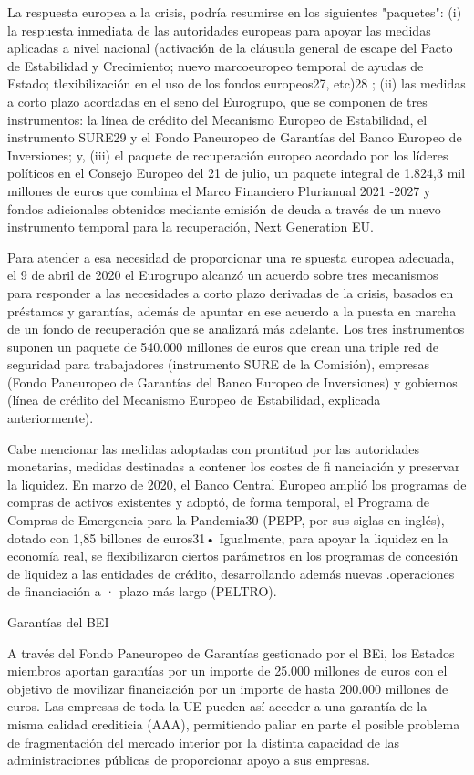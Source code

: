 \documentclass[10pt,a4paper]{article}
\begin{document}
La respuesta europea a la crisis, podría resumirse en los siguientes "paquetes": (i) la respuesta inmediata de las autoridades europeas para apoyar las medidas aplicadas a nivel nacional (activación de la cláusula general de escape del Pacto de Estabilidad y Crecimiento; nuevo marcoeuropeo temporal de ayudas de Estado; tlexibilización en el uso de los fondos europeos27, etc)28 ; (ii) las medidas a corto plazo acordadas en el seno del Eurogrupo, que se componen de tres instrumentos: la línea de crédito del Mecanismo Europeo de Estabilidad, el instrumento SURE29 y el Fondo Paneuropeo de Garantías del Banco Europeo de Inversiones; y, (iii) el paquete de recuperación europeo acordado por los líderes políticos en el Consejo Europeo del 21 de julio, un paquete integral de 1.824,3 mil millones de euros que combina el Marco Financiero Plurianual 2021 -2027 y fondos adicionales obtenidos mediante emisión de deuda a través de un nuevo instrumento temporal para la recuperación, Next Generation EU.

Para atender a esa necesidad de proporcionar una re spuesta europea adecuada, el 9 de abril de 2020 el Eurogrupo alcanzó un acuerdo sobre tres mecanismos para responder a las necesidades a corto plazo derivadas de la crisis, basados en préstamos y garantías, además de apuntar en ese acuerdo a la puesta en marcha de un fondo de recuperación que se analizará más adelante. Los tres instrumentos suponen un paquete de 540.000 millones de euros que crean una triple red de seguridad para trabajadores (instrumento SURE de la Comisión), empresas (Fondo Paneuropeo de Garantías del Banco Europeo de Inversiones) y gobiernos (línea de crédito del Mecanismo Europeo de Estabilidad, explicada anteriormente).

Cabe mencionar las medidas adoptadas con prontitud por las autoridades monetarias, medidas destinadas a contener los costes de fi nanciación y preservar la liquidez. En marzo de 2020, el Banco Central Europeo amplió los programas de compras de activos existentes y adoptó, de forma temporal, el Programa de Compras de Emergencia para la Pandemia30 (PEPP, por sus siglas en inglés), dotado con 1,85 billones de euros31• Igualmente, para apoyar la liquidez en la economía real, se flexibilizaron ciertos parámetros en los programas de concesión de liquidez a las entidades de crédito, desarrollando además nuevas .operaciones de financiación a · plazo más largo (PELTRO).

Garantías del BEI

A través del Fondo Paneuropeo de Garantías gestionado por el BEi, los Estados miembros aportan garantías por un importe de 25.000 millones de euros con el objetivo de movilizar financiación por un importe de hasta 200.000 millones de euros. Las empresas de toda la UE pueden así acceder a una garantía de la misma calidad crediticia (AAA), permitiendo paliar en parte el posible problema de fragmentación del mercado interior por la distinta capacidad de las administraciones públicas de proporcionar apoyo a sus empresas.
\end{document}
